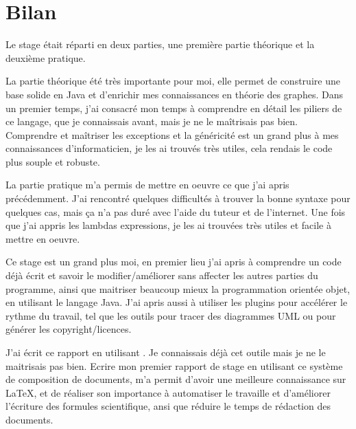\documentclass[12pt]{report}
\begin{document}
\section{Bilan}

Le stage était réparti en deux parties, une première partie théorique et la deuxième pratique.\newline

La partie théorique été très importante pour moi, elle permet de construire une base solide en Java et d'enrichir mes connaissances en théorie des graphes. Dans un premier temps, j'ai consacré mon temps à comprendre en détail les piliers de ce langage, que je connaissais avant, mais je ne le maîtrisais pas bien. Comprendre et maîtriser les exceptions et la généricité est un grand plus à mes connaissances d'informaticien, je les ai trouvés très utiles, cela rendais le code plus souple et robuste.\newline

La partie pratique m'a permis de mettre en oeuvre ce que j'ai apris précédemment. J'ai rencontré quelques difficultés à trouver la bonne syntaxe pour quelques cas, mais ça n'a pas duré avec l'aide du tuteur et de l'internet. Une fois que j'ai appris les lambdas expressions, je les ai trouvées très utiles et facile à mettre en oeuvre. \newline

Ce stage est un grand plus moi, en premier lieu j'ai apris à comprendre un code déjà écrit et savoir le modifier/améliorer sans affecter les autres parties du programme, ainsi que maitriser beaucoup mieux la programmation orientée objet, en utilisant le langage Java. J'ai apris aussi à utiliser les plugins pour accélérer le rythme du travail, tel que les outils pour tracer des diagrammes UML ou pour générer les copyright/licences.\newline

J'ai écrit ce rapport en utilisant \LaTaX. Je connaissais déjà cet outile mais je ne le maitrisais pas bien. Ecrire mon premier rapport de stage en utilisant ce système de composition de documents, m'a permit d'avoir une meilleure connaissance sur \LaTeX, et de réaliser son importance à automatiser le travaille et d'améliorer l'écriture des formules scientifique, ansi que réduire le temps de rédaction des documents.

\end{document}
